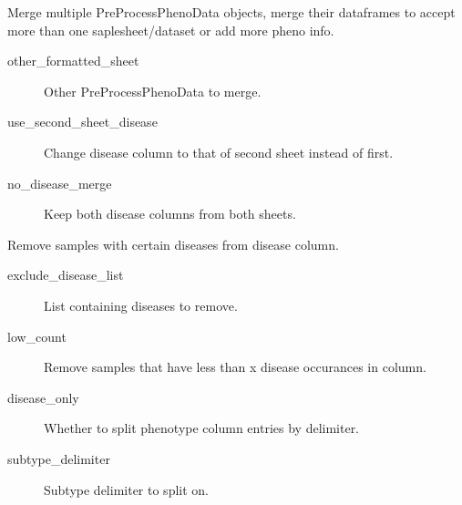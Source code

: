 \documentclass[letterpaper,10pt,english]{sphinxmanual}
\begin{document}
\begin{fulllineitems}
\begin{fulllineitems}
\label{\detokenize{index:pymethylprocess.PreProcessDataTypes.PreProcessPhenoData.merge}}
Merge multiple PreProcessPhenoData objects, merge their dataframes to accept more than one saplesheet/dataset or add more pheno info.
\begin{description}
\item[{other\_formatted\_sheet}] \leavevmode
Other PreProcessPhenoData to merge.

\item[{use\_second\_sheet\_disease}] \leavevmode
Change disease column to that of second sheet instead of first.

\item[{no\_disease\_merge}] \leavevmode
Keep both disease columns from both sheets.

\end{description}

\end{fulllineitems}


\begin{fulllineitems}
\label{\detokenize{index:pymethylprocess.PreProcessDataTypes.PreProcessPhenoData.remove_diseases}}
Remove samples with certain diseases from disease column.
\begin{description}
\item[{exclude\_disease\_list}] \leavevmode
List containing diseases to remove.

\item[{low\_count}] \leavevmode
Remove samples that have less than x disease occurances in column.

\item[{disease\_only}] \leavevmode
Whether to split phenotype column entries by delimiter.

\item[{subtype\_delimiter}] \leavevmode
Subtype delimiter to split on.


\end{description}
\end{fulllineitems}
\end{fulllineitems}
\end{document}
